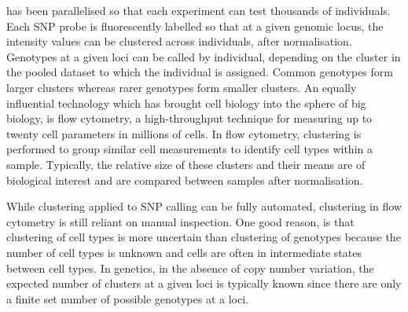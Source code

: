 has been parallelised so that each experiment can test thousands of individuals.
Each SNP probe is fluorescently labelled so that at a given genomic locus, the intensity values can be clustered across individuals, 
after normalisation.
Genotypes at a given loci can be called by individual, depending on the cluster in the pooled dataset to which the individual is assigned.
Common genotypes form larger clusters whereas rarer genotypes form smaller clusters.
An equally influential technology which has brought cell biology into the sphere of big biology, is flow cytometry,
a high-throughput technique for measuring up to twenty cell parameters in millions of cells.
In flow cytometry, clustering is performed to group similar cell measurements to identify cell types within a sample.
Typically, the relative size of these clusters and their means are of biological interest and are compared between samples after normalisation.

While clustering applied to \gls{SNP} calling can be fully automated,
clustering in flow cytometry is still reliant on manual inspection.
One good reason, is that
clustering of cell types is more uncertain than clustering of genotypes because the number of cell types is unknown and
cells are often in intermediate states between cell types.
In genetics, in the absence of copy number variation,
the expected number of clusters at a given loci is typically known
since there are only a finite set number of possible genotypes at a loci.



